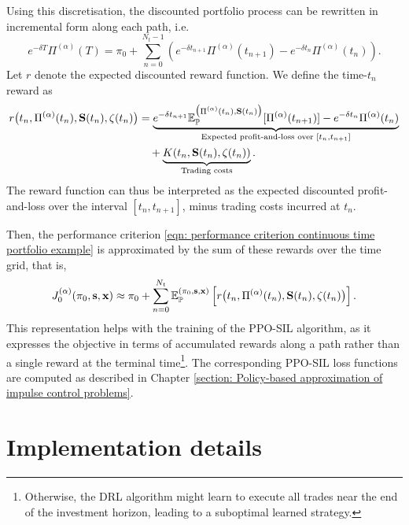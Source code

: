 Using this discretisation, the discounted portfolio process can be rewritten in incremental form along each path, i.e.
\begin{equation}
    e^{-\delta T}\Pi^{(\alpha)}(T) = \pi_0 + \sum_{n=0}^{N_t-1} \left(e^{- \delta t_{n+1}}\Pi^{(\alpha)}(t_{n+1}) - e^{-\delta t_{n}}\Pi^{(\alpha)}(t_n) \right).
    \label{eqn: portfolio incremental formula}
\end{equation}
Let $r$ denote the expected discounted reward function. We define the time-$t_n$ reward as
\begin{align*}
    r\big(t_n,\Pi^{(\alpha)}(t_n), \mathbf{S}(t_{n}),\zeta(t_n)\big) &= \underbrace{e^{-\delta t_{n+1}} \mathbb{E}_{\mathbb{P}}^{\big(\Pi^{(\alpha)}(t_n), \mathbf{S}(t_{n})\big)}[\Pi^{(\alpha)}(t_{n+1})] - e^{-\delta t_{n}}\Pi^{(\alpha)}(t_n)}_{\text{Expected profit-and-loss over } [t_n,t_{n+1}]} 
    \\& \quad + \underbrace{K(t_n, \mathbf{S}(t_n), \zeta(t_n))}_{\text{Trading costs}}.
\end{align*}
The reward function can thus be interpreted as the expected discounted profit-and-loss over the interval $[t_n,t_{n+1}]$, minus trading costs incurred at $t_n$.

Then, the performance criterion \eqref{eqn: performance criterion continuous time portfolio example} is approximated by the sum of these rewards over the time grid, that is, 
\begin{equation*}
    J^{(\alpha)}_0(\pi_0, \mathbf s, \mathbf x) \approx \pi_0 + \sum_{n=0}^{N_t}\mathbb{E}_{\mathbb{P}}^{(\pi_0, \mathbf s, \mathbf x)}\left[ r\big(t_n,\Pi^{(\alpha)}(t_n), \mathbf{S}(t_{n}), \zeta(t_n) \big) \right].
\end{equation*}
This representation helps with the training of the PPO-SIL algorithm, as it expresses the objective in terms of accumulated rewards along a path rather than a single reward at the terminal time\footnote{Otherwise, the DRL algorithm might learn to execute all trades near the end of the investment horizon, leading to a suboptimal learned strategy.}. The corresponding PPO-SIL loss functions are computed as described in Chapter \ref{section: Policy-based approximation of impulse control problems}.

\section{Implementation details}

